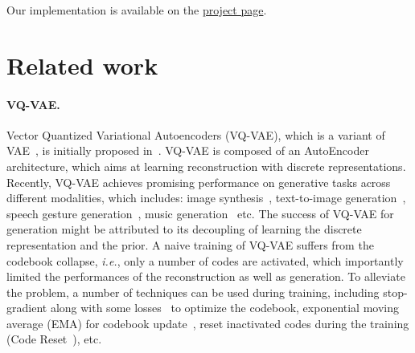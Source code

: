 \documentclass[10pt,twocolumn,letterpaper]{article}
\begin{document}
Our implementation is available on the \href{https://mael-zys.github.io/T2M-GPT/}{project page}.

\section{Related work}
\label{sec:related_work}

\paragraph{VQ-VAE.} Vector Quantized Variational Autoencoders (VQ-VAE), which is a variant of VAE~\cite{kingma2013auto}, is initially proposed in~\cite{van2017neural}. VQ-VAE is composed of an AutoEncoder architecture, which aims at learning reconstruction with discrete representations.  
Recently, VQ-VAE achieves promising performance on generative tasks across different modalities, which includes: image synthesis~\cite{williams2020hierarchical,esser2021taming}, text-to-image generation~\cite{ramesh2021zero}, speech gesture generation~\cite{ao2022rhythmic}, music generation~\cite{dieleman2018challenge,dhariwal2020jukebox} etc. The success of VQ-VAE for generation might be attributed to its decoupling of learning the discrete representation and the prior. 
A naive training of VQ-VAE suffers from the codebook collapse, \textit{i.e.}, only a number of codes are activated, which importantly limited the performances of the reconstruction as well as generation. To alleviate the problem, a number of techniques can be used during training, including stop-gradient along with some losses~\cite{van2017neural} to optimize the codebook, exponential moving average (EMA) for codebook update~\cite{williams2020hierarchical}, reset inactivated codes during the training (Code Reset~\cite{williams2020hierarchical}), etc. 
\end{document}

